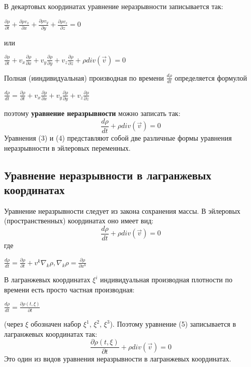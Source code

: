 В декартовых координатах уравнение неразрывности записывается так:
\begin{center}$
\frac{\partial \rho}{\partial t} + \frac{\partial \rho v_x}{\partial x} + \frac{\partial \rho v_y}{\partial y} + \frac{\partial \rho v_z}{\partial z} = 0
$\end{center}
или
\begin{center}$
\frac{\partial \rho}{\partial t} + v_x \frac{\partial \rho}{\partial x} + v_y \frac{\partial \rho}{\partial y} + v_z \frac{\partial \rho}{\partial z} + \rho div (\Vec{v}) = 0
$\end{center}
Полная (ииндивидуальная) производная по времени $\frac{d \rho}{d t}$ определяется формулой
\begin{center}$
\frac{d \rho}{d t} = \frac{\partial \rho}{\partial t} + v_x \frac{\partial \rho}{\partial x} + v_y \frac{\partial \rho}{\partial y} + v_z \frac{\partial \rho}{\partial z}
$\end{center}
поэтому \textbf{уравнение неразрывности} можно записать так:
\begin{equation}
    \frac{d \rho}{d t} + \rho div(\Vec{v}) = 0
\end{equation}
Уравнения (3) и (4) представляют собой две различные формы уравнения неразрывности в эйлеровых переменных.

\subsection{Уравнение неразрывности в лагранжевых координатах}
Уравнение неразрывности следует из закона сохранения массы. В эйлеровых (пространственных) координатах оно имеет вид:
\begin{equation}
    \frac{d \rho}{d t} + \rho div(\Vec{v}) = 0
\end{equation}
где
\begin{center}$
\frac{d \rho}{d t} = \frac{\partial \rho}{\partial t} + v^k \nabla_k \rho,
\nabla_k \rho = \frac{\partial \rho}{\partial x^k}
$\end{center}
В лагранжевых координатах $\xi^i$ индивидуальная производная плотности по времени есть просто частная производная:
\begin{center}$
\frac{d \rho}{d t}  = \frac{\partial \rho (t, \xi)}{\partial t}
$\end{center}
(через $\xi$ обозначен набор $\xi^1$, $\xi^2$, $\xi^3$). Поэтому уравнение (5) записывается в лагранжевых координатах так:
\begin{equation}
    \frac{\partial \rho (t, \xi)}{\partial t} + \rho div(\Vec{v}) = 0
\end{equation}
Это один из видов уравнения неразрывности в лагранжевых координатах.